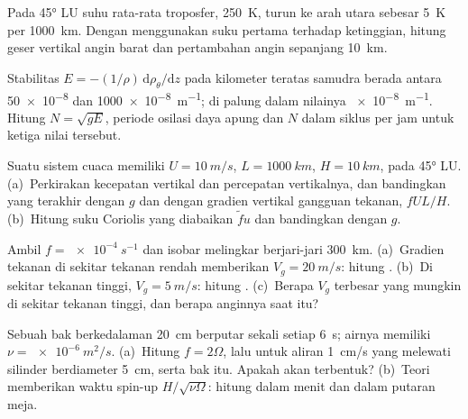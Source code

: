 \begin{exercise}[$\star$]\label{exo:b3:gfd-foundations:3}
Pada \ang{45} LU suhu rata-rata troposfer, \qty{250}{K}, turun
ke arah utara sebesar \qty{5}{K} per \qty{1000}{km}. Dengan menggunakan suku pertama
 terhadap ketinggian, hitung geser vertikal angin barat dan
pertambahan angin sepanjang \qty{10}{km}.
\end{exercise}

\begin{exercise}[$\star$]\label{exo:b3:gfd-foundations:4}
Stabilitas $E = -(1/\rho)\,\mathrm d\rho_\theta/\mathrm dz$ pada kilometer
teratas samudra berada antara \num{50e-8} dan \qty{1000e-8}{m^{-1}};
di palung dalam nilainya \qty{e-8}{m^{-1}}. Hitung $N = \sqrt{gE}$, periode
osilasi daya apung dan $N$ dalam siklus per jam untuk ketiga
nilai tersebut.
\end{exercise}

\begin{exercise}[$\star\star$]\label{exo:b3:gfd-foundations:5}
Suatu sistem cuaca memiliki $U = \qty{10}{m/s}$, $L = \qty{1000}{km}$, $H =
\qty{10}{km}$, pada \ang{45} LU. (a)~Perkirakan kecepatan vertikal dan
percepatan vertikalnya, dan bandingkan yang terakhir dengan $g$ dan dengan
gradien vertikal gangguan tekanan, $fUL/H$. (b)~Hitung
suku Coriolis yang diabaikan $\tilde fu$ dan bandingkan dengan $g$.
\end{exercise}

\begin{exercise}[$\star\star$]\label{exo:b3:gfd-foundations:6}
Ambil $f = \qty{e-4}{s^{-1}}$ dan isobar melingkar berjari-jari
\qty{300}{km}. (a)~Gradien tekanan di sekitar tekanan rendah memberikan $V_g =
\qty{20}{m/s}$: hitung . (b)~Di sekitar tekanan tinggi,
$V_g = \qty{5}{m/s}$: hitung . (c)~Berapa $V_g$ terbesar
yang mungkin di sekitar tekanan tinggi, dan berapa anginnya saat itu?
\end{exercise}

\begin{exercise}[$\star\star$]\label{exo:b3:gfd-foundations:7}
Sebuah bak berkedalaman \qty{20}{cm} berputar sekali setiap \qty{6}{s}; airnya memiliki $\nu =
\qty{e-6}{m^2/s}$. (a)~Hitung $f = 2\Omega$, lalu  untuk
aliran \qty{1}{cm/s} yang melewati silinder berdiameter \qty{5}{cm}, serta 
bak itu. Apakah  akan terbentuk? (b)~Teori memberikan
waktu spin-up $H/\sqrt{\nu\Omega}$: hitung dalam menit dan dalam putaran meja.
\end{exercise}

